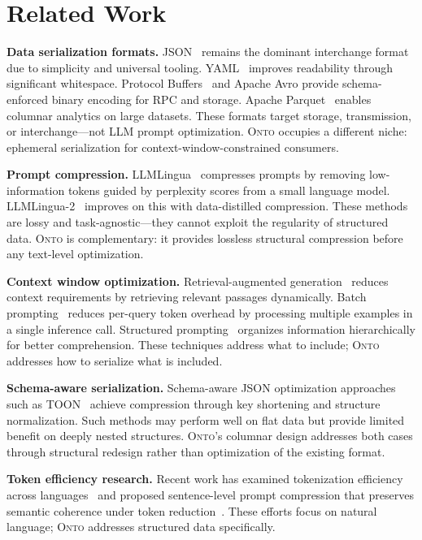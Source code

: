 \documentclass[10pt,twocolumn]{article}
\newcommand{\onto}{\textsc{Onto}\xspace}
\begin{document}
\section{Related Work}

\textbf{Data serialization formats.} JSON~\citep{rfc8259} remains the dominant interchange format due to simplicity and universal tooling. YAML~\citep{yaml12} improves readability through significant whitespace. Protocol Buffers~\citep{protobuf} and Apache Avro provide schema-enforced binary encoding for RPC and storage. Apache Parquet~\citep{parquet} enables columnar analytics on large datasets. These formats target storage, transmission, or interchange---not LLM prompt optimization. \onto occupies a different niche: ephemeral serialization for context-window-constrained consumers.

\textbf{Prompt compression.} LLMLingua~\citep{jiang2023llmlingua} compresses prompts by removing low-information tokens guided by perplexity scores from a small language model. LLMLingua-2~\citep{pan2024llmlingua2} improves on this with data-distilled compression. These methods are lossy and task-agnostic---they cannot exploit the regularity of structured data. \onto is complementary: it provides lossless structural compression before any text-level optimization.

\textbf{Context window optimization.} Retrieval-augmented generation~\citep{lewis2020rag} reduces context requirements by retrieving relevant passages dynamically. Batch prompting~\citep{cheng2023batch} reduces per-query token overhead by processing multiple examples in a single inference call. Structured prompting~\citep{hao2022structured} organizes information hierarchically for better comprehension. These techniques address what to include; \onto addresses how to serialize what is included.

\textbf{Schema-aware serialization.} Schema-aware JSON optimization approaches such as TOON~\citep{toon2024} achieve compression through key shortening and structure normalization. Such methods may perform well on flat data but provide limited benefit on deeply nested structures. \onto's columnar design addresses both cases through structural redesign rather than optimization of the existing format.

\textbf{Token efficiency research.} Recent work has examined tokenization efficiency across languages~\citep{petrov2023language} and proposed sentence-level prompt compression that preserves semantic coherence under token reduction~\citep{liskavets2024prompt}. These efforts focus on natural language; \onto addresses structured data specifically.
\end{document}
